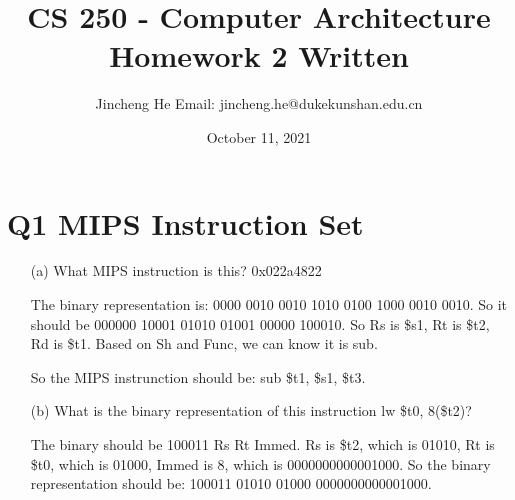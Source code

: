 \documentclass{article}
\title{CS 250 - Computer Architecture \\ Homework 2 Written}
\author{Jincheng He Email: jincheng.he@dukekunshan.edu.cn}
\date{October 11, 2021}
\theoremstyle{remark}
\theoremstyle{definition}
\begin{document}
    \maketitle


    \section{Q1 MIPS Instruction Set}
    \begin{enumerate}
        \item[(a)] What MIPS instruction is this? 0x022a4822

        The binary representation is: 0000 0010 0010 1010 0100 1000 0010 0010. So it should be 000000 10001 01010 01001 00000 100010. So Rs is \$s1, Rt is \$t2, Rd is \$t1.
        Based on Sh and Func, we can know it is sub.

        So the MIPS instrunction should be: sub \$t1, \$s1, \$t3.
        \item[(b)] What is the binary representation of this instruction lw \$t0, 8(\$t2)?

        The binary should be 100011 Rs Rt Immed. Rs is \$t2, which is 01010, Rt is \$t0, which is 01000, Immed is 8, which is 0000000000001000. So the binary representation should be: 100011 01010 01000 0000000000001000.
    \end{enumerate}
\end{document}
